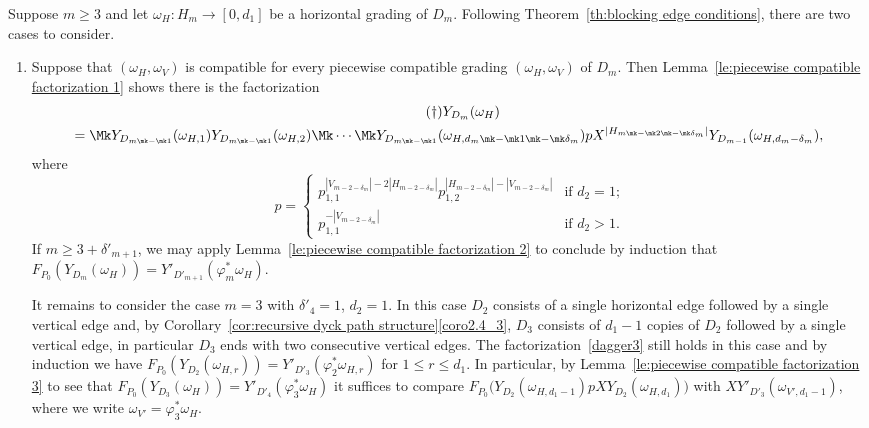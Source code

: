 Suppose $m\ge3$ and let $\omega_H:H_m\to[0,d_1]$ be a horizontal grading of $D_m$.
Following Theorem~\ref{th:blocking edge conditions}, there are two cases to consider.
\begin{enumerate}[label=(\alph*)]
 \item Suppose that $(\omega_H,\omega_V)$ is compatible for every piecewise compatible grading $(\omega_H,\omega_V)$ of $D_m$.
 Then Lemma~\ref{le:piecewise compatible factorization 1} shows there is the factorization
 \begin{multline}\label{dagger3}
 \tag{$\dagger$}
 Y_{D_m}(\omega_H)\\
 =\Mk Y_{D_{m\mk -\mk 1}}(\omega_{H,1})Y_{D_{m\mk -\mk 1}}(\omega_{H,2})\Mk\cdots\Mk Y_{D_{m\mk -\mk 1}}(\omega_{H,d_m\mk -\mk 1\mk -\mk \delta_m})pX^{|H_{m\mk -\mk 2\mk -\mk \delta_m}|} Y_{D_{m-1}}(\omega_{H,d_m-\delta_m}),
 \end{multline}
 where 
 \[p=\begin{cases} p_{1,1}^{|V_{m-2-\delta_m}|-2|H_{m-2-\delta_m}|}p_{1,2}^{|H_{m-2-\delta_m}|-|V_{m-2-\delta_m}|} & \text{if $d_2=1$;}\\ p_{1,1}^{-|V_{m-2-\delta_m}|} & \text{if $d_2>1$.}\end{cases}\]
 If $m\ge3+\delta'_{m+1}$, we may apply Lemma~\ref{le:piecewise compatible factorization 2} to conclude by induction that $F_{P_0}(Y_{D_m}(\omega_H))=Y'_{D'_{m+1}}(\varphi^*_m\omega_H)$.

 It remains to consider the case $m=3$ with $\delta'_4=1$, \ie $d_2=1$.
 In this case $D_2$ consists of a single horizontal edge followed by a single vertical edge and, by Corollary~\ref{cor:recursive dyck path structure}\ref{coro2.4_3}, $D_3$ consists of $d_1-1$ copies of $D_2$ followed by a single vertical edge, in particular $D_3$ ends with two consecutive vertical edges.
 The factorization~\eqref{dagger3} still holds in this case and by induction we have $F_{P_0}(Y_{D_2}(\omega_{H,r}))=Y'_{D'_3}(\varphi^*_2\omega_{H,r})$ for $1\le r\le d_1$.
 In particular, by Lemma~\ref{le:piecewise compatible factorization 3} to see that $F_{P_0}(Y_{D_3}(\omega_H))=Y'_{D'_4}(\varphi^*_3\omega_H)$ it suffices to compare $F_{P_0}\big(Y_{D_2}(\omega_{H,d_1-1})pXY_{D_2}(\omega_{H,d_1})\big)$ with $XY'_{D'_3}(\omega_{V',d_1-1})$, where we write $\omega_{V'}=\varphi^*_3\omega_H$.


\end{enumerate}
